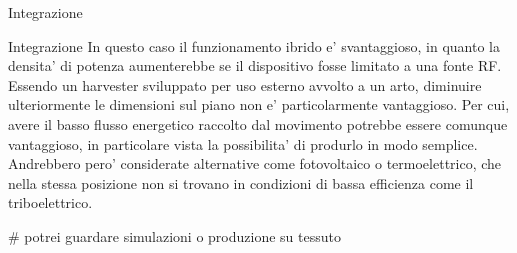 \begin{section}{Integrazione}
\begin{subsection}{Integrazione}
        In questo caso il funzionamento ibrido e' svantaggioso, in quanto la densita' di potenza aumenterebbe se il dispositivo fosse limitato a una fonte RF. Essendo un harvester sviluppato per uso esterno avvolto a un arto, diminuire ulteriormente le dimensioni sul piano non e' particolarmente vantaggioso. Per cui, avere il basso flusso energetico raccolto dal movimento potrebbe essere comunque vantaggioso, in particolare vista la possibilita' di produrlo in modo semplice. Andrebbero pero' considerate alternative come fotovoltaico o termoelettrico, che nella stessa posizione non si trovano in condizioni di bassa efficienza come il triboelettrico. 
    \end{subsection}

    \# potrei guardare simulazioni o produzione su tessuto

\end{section}